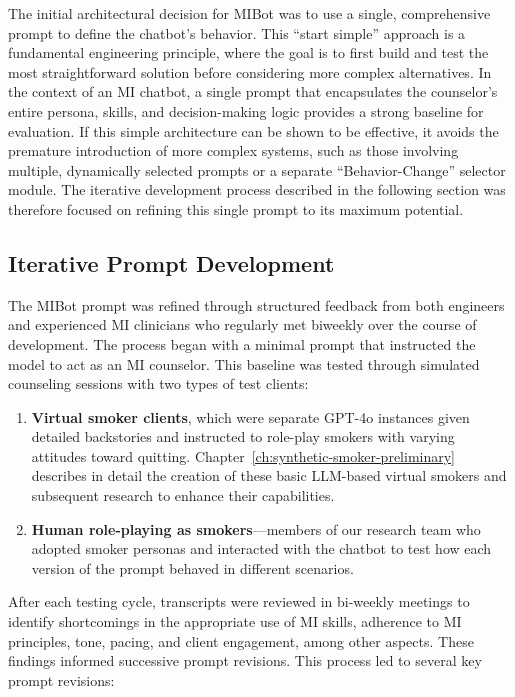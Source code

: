 The initial architectural decision for MIBot was to use a single, comprehensive prompt to define the chatbot's behavior. This ``start simple'' approach is a fundamental engineering principle, where the goal is to first build and test the most straightforward solution before considering more complex alternatives. In the context of an MI chatbot, a single prompt that encapsulates the counselor's entire persona, skills, and decision-making logic provides a strong baseline for evaluation. If this simple architecture can be shown to be effective, it avoids the premature introduction of more complex systems, such as those involving multiple, dynamically selected prompts or a separate ``Behavior-Change'' selector module. The iterative development process described in the following section was therefore focused on refining this single prompt to its maximum potential.

\subsection{Iterative Prompt Development}
The MIBot prompt was refined through structured feedback from both engineers and experienced MI clinicians who regularly met biweekly over the course of development. The process began with a minimal prompt that instructed the model to act as an MI counselor. This baseline was tested through simulated counseling sessions with two types of test clients:

\begin{enumerate}
    \item \textbf{Virtual smoker clients}, which were separate GPT-4o instances given detailed backstories and instructed to role-play smokers with varying attitudes toward quitting. Chapter~\ref{ch:synthetic-smoker-preliminary} describes in detail the creation of these basic LLM-based virtual smokers and subsequent research to enhance their capabilities.
    \item \textbf{Human role-playing as smokers}---members of our research team who adopted smoker personas and interacted with the chatbot to test how each version of the prompt behaved in different scenarios.
\end{enumerate}

After each testing cycle, transcripts were reviewed in bi-weekly meetings to identify shortcomings in the appropriate use of MI skills, adherence to MI principles, tone, pacing, and client engagement, among other aspects. These findings informed successive prompt revisions. 
This process led to several key prompt revisions:


